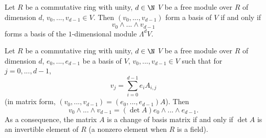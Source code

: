 \begin{proposition}
  Let
    $R$ be a commutative ring with unity,
    $d \in \N$
    $V$ be a free module over $R$ of dimension $d$,
    $v_0, ..., v_{d - 1} \in V$.
  Then $(v_0, ..., v_{d - 1})$ form a basis of $V$
  if and only if
  \begin{equation}
    v_0 \wedge ... \wedge v_{d - 1}
  \end{equation}
  forms a basis of the $1$-dimensional module $\Lambda^d V$.
\end{proposition}
\begin{proposition}
  Let
    $R$ be a commutative ring with unity,
    $d \in \N$
    $V$ be a free module over $R$ of dimension $d$,
    $e_0, ..., e_{d - 1}$ be a basis of $V$,
    $v_0, ..., v_{d - 1} \in V$ such that for $j = 0, ..., d - 1$,
  \begin{equation}
    v_j = \sum_{i = 0}^{d - 1} e_i A_{i, j}
  \end{equation}
  (in matrix form, $(v_0, ..., v_{d - 1}) = (e_0, ..., e_{d - 1}) A$).
  Then
  \begin{equation}
    v_0 \wedge ... \wedge v_{d - 1} = (\det A) e_0 \wedge ... \wedge e_{d - 1}.
  \end{equation}
  As a consequence, the matrix $A$ is a change of basis matrix if and only if
  $\det A$ is an invertible element of $R$
  (a nonzero element when $R$ is a field).
\end{proposition}
